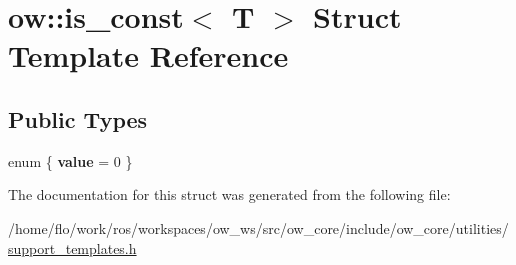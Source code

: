 \hypertarget{structow_1_1is__const}{}\section{ow\+:\+:is\+\_\+const$<$ T $>$ Struct Template Reference}
\label{structow_1_1is__const}
\subsection*{Public Types}
\begin{DoxyCompactItemize}
\item 
enum \{ {\bfseries value} = 0
 \}\hypertarget{structow_1_1is__const_aa6b5b09fb8c22e6fc9a5c067d78fd168}{}\label{structow_1_1is__const_aa6b5b09fb8c22e6fc9a5c067d78fd168}

\end{DoxyCompactItemize}


The documentation for this struct was generated from the following file\+:\begin{DoxyCompactItemize}
\item 
/home/flo/work/ros/workspaces/ow\+\_\+ws/src/ow\+\_\+core/include/ow\+\_\+core/utilities/\hyperlink{support__templates_8h}{support\+\_\+templates.\+h}\end{DoxyCompactItemize}
